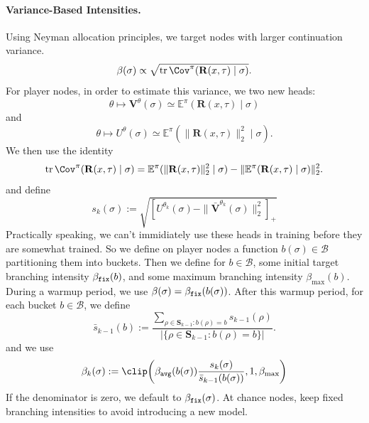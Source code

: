 \documentclass[12pt, a4paper]{article}
\begin{document}
\paragraph{Variance-Based Intensities.}
Using Neyman allocation principles, we target nodes with larger continuation variance.
\begin{equation}\label{eq:branched-neyman-intensity}
  \beta(\sigma) \propto \sqrt{\operatorname{tr}\Cov^\pi(\mathbf{R}(x,\tau)\mid\sigma)}.
\end{equation}
For player nodes, in order to estimate this variance, we two new heads:
\begin{equation}\label{eq:V-vector-head}
  \theta
  \longmapsto
  \mathbf V^\theta(\sigma)
  \simeq
  \mathbb{E}^\pi(\mathbf{R}(x,\tau)\mid \sigma)
\end{equation}
and
\begin{equation}\label{eq:U-head}
  \theta
  \longmapsto
  U^\theta(\sigma)
  \simeq
  \mathbb{E}^\pi(\|\mathbf{R}(x,\tau)\|_2^2\mid\sigma).
\end{equation}
We then use the identity
\[
  \operatorname{tr}\Cov^\pi(\mathbf{R}(x,\tau)\mid\sigma)
  =
  \mathbb{E}^\pi(\|\mathbf{R}(x,\tau)\|_2^2\mid\sigma)
  -
  \|\mathbb{E}^\pi(\mathbf{R}(x,\tau)\mid\sigma)\|_2^2.
\]
and define
\[
  s_k(\sigma)
  :=
  \sqrt{\left[U^{\theta_k}(\sigma)-\|\bar{\mathbf V}^{\theta_k}(\sigma)\|_2^2\right]_+}
\]
Practically speaking, we can't immidiately use these heads in training before they are somewhat trained.
So we define on player nodes a function $b(\sigma) \in \mathcal{B}$ partitioning them into buckets.
Then we define for $b \in \mathcal{B}$, some initial target branching intensity $\beta_{\tt fix}(b)$, and some maximum branching intensity $\beta_{\max}(b)$.
During a warmup period, we use $\beta(\sigma) = \beta_{\tt fix}(b(\sigma))$.
After this warmup period, for each bucket $b \in \mathcal{B}$, we define
\[
  \bar s_{k-1}(b)
  :=
  \frac{\sum_{\rho\in\mathbf S_{k-1}: b(\rho)=b}s_{k-1}(\rho)}
       {\left|\{\rho\in\mathbf S_{k-1}: b(\rho)=b\}\right|}.
\]
and we use
\[
  \beta_k(\sigma)
  :=
  \clip\!\left(\beta_{\tt avg}(b(\sigma))\frac{s_k(\sigma)}{\bar s_{k-1}(b(\sigma))},1,\beta_{\max}\right)
\]
If the denominator is zero, we default to $\beta_{\tt fix}(\sigma)$.
At chance nodes, keep fixed branching intensities to avoid introducing a new model.
\end{document}
